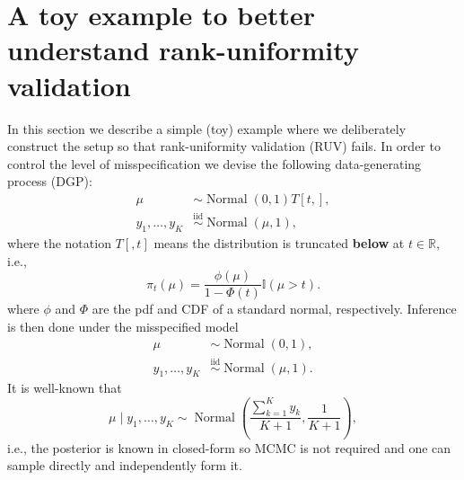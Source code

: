 \documentclass[oneside]{article}
\begin{document}


\section{A toy example to better understand rank-uniformity validation}
\label{sec:supp_toy}

In this section we describe a simple (toy) example where we deliberately construct the setup so that rank-uniformity validation (RUV) fails.
In order to control the level of misspecification we devise the following data-generating process (DGP):
\begin{align*}
 \mu & \sim \operatorname{Normal}\left(0, 1\right)T[t, ],\\
  y_1, \ldots, y_K & \overset{\text{iid}}{\sim} \operatorname{Normal}\left(\mu, 1\right),
\end{align*}
where the notation $T[, t]$ means the distribution is truncated \textbf{below} at $t \in \mathbb{R}$, i.e.,
\begin{equation*}
    \pi_{t}(\mu) = \frac{\phi(\mu)}{1 - \Phi(t)} \mathbb{I}(\mu > t).
\end{equation*}
where $\phi$ and $\Phi$ are the pdf and CDF of a standard normal, respectively.
Inference is then done under the misspecified model
\begin{align*}
 \mu & \sim \operatorname{Normal}\left(0, 1\right),\\
  y_1, \ldots, y_K & \overset{\text{iid}}{\sim} \operatorname{Normal}\left(\mu, 1\right).
\end{align*}
It is well-known that
\begin{equation}
\label{eq:toy_normal_posterior}
    \mu \mid y_1, \ldots, y_K \sim \operatorname{Normal}\left( \frac{\sum_{k = 1}^K y_k}{K + 1},  \frac{1}{K + 1} \right),
\end{equation}
i.e., the posterior is known in closed-form so MCMC is not required and one can sample directly and independently form it.
\end{document}
